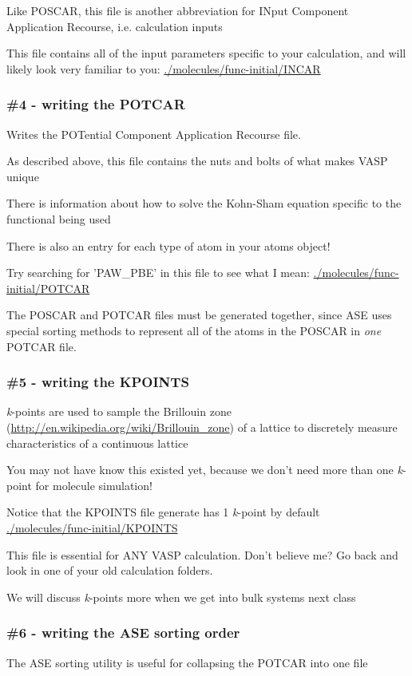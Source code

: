 \documentclass[11pt]{article}
\begin{document}
Like POSCAR, this file is another abbreviation for INput Component Application Recourse, i.e. calculation inputs

This file contains all of the input parameters specific to your calculation, and will likely look very familiar to you:
\url{./molecules/func-initial/INCAR}

\subsubsection{\#4 - writing the POTCAR}
\label{sec-2-2-4}
Writes the POTential Component Application Recourse file.

As described above, this file contains the nuts and bolts of what makes VASP unique

There is information about how to solve the Kohn-Sham equation specific to the functional being used

There is also an entry for each type of atom in your atoms object!

Try searching for 'PAW\_PBE' in this file to see what I mean:
\url{./molecules/func-initial/POTCAR}

The POSCAR and POTCAR files must be generated together, since ASE uses special sorting methods to represent all of the atoms in the POSCAR in \emph{one} POTCAR file.

\subsubsection{\#5 - writing the KPOINTS}
\label{sec-2-2-5}
\emph{k}-points are used to sample the Brillouin zone (\url{http://en.wikipedia.org/wiki/Brillouin_zone}) of a lattice to discretely measure characteristics of a continuous lattice

You may not have know this existed yet, because we don't need more than one \emph{k}-point for molecule simulation!

Notice that the KPOINTS file generate has 1 \emph{k}-point by default
\url{./molecules/func-initial/KPOINTS}

This file is essential for ANY VASP calculation. Don't believe me? Go back and look in one of your old calculation folders.

We will discuss \emph{k}-points more when we get into bulk systems next class

\subsubsection{\#6 - writing the ASE sorting order}
\label{sec-2-2-6}
The ASE sorting utility is useful for collapsing the POTCAR into one file
\end{document}
